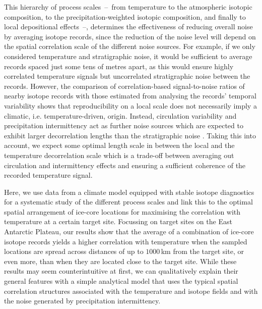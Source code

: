 \documentclass[cp, manuscript, draft]{copernicus}
\begin{document}
This hierarchy of process scales~--~from temperature to the atmospheric isotopic
composition, to the precipitation-weighted isotopic composition, and finally to
local depositional effects~--, determines the effectiveness of reducing overall
noise by averaging isotope records, since the reduction of the noise level will
depend on the spatial correlation scale of the different noise sources. For
example, if we only considered temperature and stratigraphic noise, it would be
sufficient to average records spaced just some tens of metres apart, as this
would ensure highly correlated temperature signals but uncorrelated
stratigraphic noise between the records. However, the comparison of
correlation-based signal-to-noise ratios of nearby isotope records
\citep{Munch2016,Munch2017} with those estimated from analysing the records'
temporal variability \citep{Laepple2018} shows that reproducibility on a local
scale does not necessarily imply a climatic, i.e. temperature-driven,
origin. Instead, circulation variability and precipitation intermittency act as
further noise sources which are expected to exhibit larger decorrelation lengths
than the stratigraphic noise \citep{Laepple2018,Munch2018a}. Taking this into
account, we expect some optimal length scale in between the local and the
temperature decorrelation scale which is a trade-off between averaging out
circulation and intermittency effects and ensuring a sufficient coherence of the
recorded temperature signal.

Here, we use data from a climate model equipped with stable isotope diagnostics
for a systematic study of the different process scales and link this to the
optimal spatial arrangement of ice-core locations for maximising the correlation
with temperature at a certain target site. Focussing on target sites on the East
Antarctic Plateau, our results show that the average of a combination of
ice-core isotope records yields a higher correlation with temperature when the
sampled locations are spread across distances of up to $1000$\,km from the
target site, or even more, than when they are located close to the target
site. While these results may seem counterintuitive at first, we can
qualitatively explain their general features with a simple analytical model that
uses the typical spatial correlation structures associated with the temperature
and isotope fields and with the noise generated by precipitation intermittency.
\end{document}
